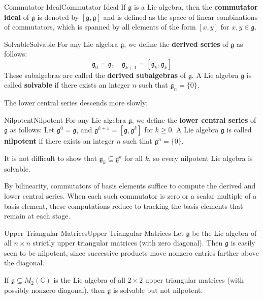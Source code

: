 \documentclass[../main.tex]{subfiles}
\begin{document}
\begin{definition}{Commutator Ideal}{Commutator Ideal}
  If $\mathfrak{g}$ is a Lie algebra, then the \textbf{commutator ideal} of $\mathfrak{g}$ is denoted by $[\mathfrak{g},\mathfrak{g}]$ and is defined as the space of linear combinations of commutators, which is spanned by all elements of the form $[x,y]$ for $x,y\in\mathfrak{g}$.
\end{definition}

\begin{definition}{Solvable}{Solvable}
  For any Lie algebra $\mathfrak{g}$, we define the \textbf{derived series} of $\mathfrak{g}$ as follows:
  \begin{equation}
    \mathfrak{g}_0 = \mathfrak{g},\quad \mathfrak{g}_{k+1} = [\mathfrak{g}_k,\mathfrak{g}_k]
  \end{equation}
  These subalgebras are called the \textbf{derived subalgebras} of $\mathfrak{g}$. A Lie algebra $\mathfrak{g}$ is called \textbf{solvable} if there exists an integer $n$ such that $\mathfrak{g}_n = \{0\}$.
\end{definition}

The lower central series descends more slowly:
\begin{definition}{Nilpotent}{Nilpotent}
  For any Lie algebra $\mathfrak{g}$, we define the \textbf{lower central series} of $\mathfrak{g}$ as follows: Let $\mathfrak{g}^0 = \mathfrak{g}$, and $\mathfrak{g}^{k+1} = [\mathfrak{g},\mathfrak{g}^k]$ for $k \geq 0$. A Lie algebra $\mathfrak{g}$ is called \textbf{nilpotent} if there exists an integer $n$ such that $\mathfrak{g}^n = \{0\}$.
\end{definition}

It is not difficult to show that $\mathfrak{g}_k \subseteq \mathfrak{g}^k$ for all $k$, so every nilpotent Lie algebra is solvable.

\begin{remark}
  By bilinearity, commutators of basis elements suffice to compute the derived and lower central series. When each such commutator is zero or a scalar multiple of a basis element, these computations reduce to tracking the basis elements that remain at each stage.
\end{remark}

\begin{example}{Upper Triangular Matrices}{Upper Triangular Matrices}
  Let $\mathfrak{g}$ be the Lie algebra of all $n \times n$ strictly upper triangular matrices (with zero diagonal). Then $\mathfrak{g}$ is easily seen to be nilpotent, since successive products move nonzero entries farther above the diagonal.

  \medskip
  If $\mathfrak{g} \subseteq M_2(\mathbb{C})$ is the Lie algebra of all $2 \times 2$ upper triangular matrices (with possibly nonzero diagonal), then $\mathfrak{g}$ is solvable but not nilpotent.
\end{example}
\end{document}
